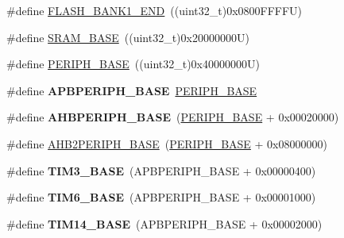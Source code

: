 \begin{DoxyCompactItemize}
\item 
\#define \hyperlink{group___peripheral__memory__map_ga443a2786535d83e32dfdc2b29e379332}{F\+L\+A\+S\+H\+\_\+\+B\+A\+N\+K1\+\_\+\+E\+ND}~((uint32\+\_\+t)0x0800\+F\+F\+F\+F\+U)
\item 
\#define \hyperlink{group___peripheral__memory__map_ga05e8f3d2e5868754a7cd88614955aecc}{S\+R\+A\+M\+\_\+\+B\+A\+SE}~((uint32\+\_\+t)0x20000000\+U)
\item 
\#define \hyperlink{group___peripheral__memory__map_ga9171f49478fa86d932f89e78e73b88b0}{P\+E\+R\+I\+P\+H\+\_\+\+B\+A\+SE}~((uint32\+\_\+t)0x40000000\+U)
\item 
\mbox{\label{group___peripheral__memory__map_gac85f31889eb6a3f651b563bbc7131f91}} 
\#define {\bfseries A\+P\+B\+P\+E\+R\+I\+P\+H\+\_\+\+B\+A\+SE}~\hyperlink{group___peripheral__memory__map_ga9171f49478fa86d932f89e78e73b88b0}{P\+E\+R\+I\+P\+H\+\_\+\+B\+A\+SE}
\item 
\mbox{\label{group___peripheral__memory__map_ga92eb5d49730765d2abd0f5b09548f9f5}} 
\#define {\bfseries A\+H\+B\+P\+E\+R\+I\+P\+H\+\_\+\+B\+A\+SE}~(\hyperlink{group___peripheral__memory__map_ga9171f49478fa86d932f89e78e73b88b0}{P\+E\+R\+I\+P\+H\+\_\+\+B\+A\+SE} + 0x00020000)
\item 
\#define \hyperlink{group___peripheral__memory__map_gaeedaa71d22a1948492365e2cd26cfd46}{A\+H\+B2\+P\+E\+R\+I\+P\+H\+\_\+\+B\+A\+SE}~(\hyperlink{group___peripheral__memory__map_ga9171f49478fa86d932f89e78e73b88b0}{P\+E\+R\+I\+P\+H\+\_\+\+B\+A\+SE} + 0x08000000)
\item 
\mbox{\label{group___peripheral__memory__map_gaf0c34a518f87e1e505cd2332e989564a}} 
\#define {\bfseries T\+I\+M3\+\_\+\+B\+A\+SE}~(A\+P\+B\+P\+E\+R\+I\+P\+H\+\_\+\+B\+A\+SE + 0x00000400)
\item 
\mbox{\label{group___peripheral__memory__map_ga8268ec947929f192559f28c6bf7d1eac}} 
\#define {\bfseries T\+I\+M6\+\_\+\+B\+A\+SE}~(A\+P\+B\+P\+E\+R\+I\+P\+H\+\_\+\+B\+A\+SE + 0x00001000)
\item 
\mbox{\label{group___peripheral__memory__map_ga862855347d6e1d92730dfe17ee8e90b8}} 
\#define {\bfseries T\+I\+M14\+\_\+\+B\+A\+SE}~(A\+P\+B\+P\+E\+R\+I\+P\+H\+\_\+\+B\+A\+SE + 0x00002000)

\end{DoxyCompactItemize}
